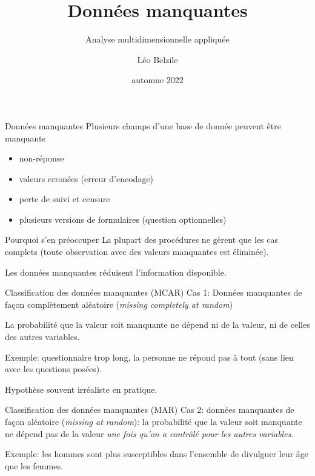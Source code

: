 \documentclass[
  ignorenonframetext,
]{beamer}
\title{Données manquantes}
\subtitle{Analyse multidimensionnelle appliquée}
\author{Léo Belzile}
\date{automne 2022}
\institute{HEC Montréal}
\providecommand{\tightlist}{%
  \setlength{\itemsep}{0pt}\setlength{\parskip}{0pt}}\usepackage{longtable,booktabs,array}
\begin{document}
\frame{\titlepage}
\ifdefined\Shaded\renewenvironment{Shaded}{\begin{tcolorbox}[enhanced, frame hidden, borderline west={3pt}{0pt}{shadecolor}, interior hidden, boxrule=0pt, sharp corners, breakable]}{\end{tcolorbox}}\fi

\begin{frame}{Données manquantes}
\protect\hypertarget{donnuxe9es-manquantes}{}
Plusieurs champs d'une base de donnée peuvent être manquants

\begin{itemize}
\tightlist
\item
  non-réponse
\item
  valeurs erronées (erreur d'encodage)
\item
  perte de suivi et censure
\item
  plusieurs versions de formulaires (question optionnelles)
\end{itemize}
\end{frame}

\begin{frame}{Pourquoi s'en préoccuper}
\protect\hypertarget{pourquoi-sen-pruxe9occuper}{}
La plupart des procédures ne gèrent que les cas complets (toute
observation avec des valeurs manquantes est éliminée).

Les données manquantes réduisent l'information disponible.
\end{frame}

\begin{frame}{Classification des données manquantes (MCAR)}
\protect\hypertarget{classification-des-donnuxe9es-manquantes-mcar}{}
Cas 1: Données manquantes de façon complètement aléatoire (\emph{missing
completely at random})

La probabilité que la valeur soit manquante ne dépend ni de la valeur,
ni de celles des autres variables.

Exemple: questionnaire trop long, la personne ne répond pas à tout (sans
lien avec les questions posées).

Hypothèse souvent irréaliste en pratique.
\end{frame}

\begin{frame}{Classification des données manquantes (MAR)}
\protect\hypertarget{classification-des-donnuxe9es-manquantes-mar}{}
Cas 2: données manquantes de façon aléatoire (\emph{missing at random}):
la probabilité que la valeur soit manquante ne dépend pas de la valeur
\emph{une fois qu'on a contrôlé pour les autres variables}.

Exemple: les hommes sont plus susceptibles dans l'ensemble de divulguer
leur âge que les femmes.
\end{frame}
\end{document}
